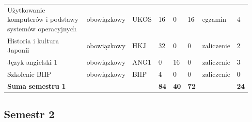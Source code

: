 \documentclass[12pt,a4paper]{article}
\begin{document}
{\begin{longtable}{m{5.0cm}m{1.9cm}m{0.75cm}m{0.85cm}m{0.85cm}m{0.85cm}m{1.45cm}m{0.9cm}}
\rowcolor{tableRowLight} Użytkowanie komputerów i podstawy systemów operacyjnych & {\scriptsize obowiązkowy} & UKOS & 16 & 0 & 16 & {\scriptsize egzamin} & 4 \\
\rowcolor{tableRowAlt} Historia i kultura Japonii & {\scriptsize obowiązkowy} & HKJ & 32 & 0 & 0 & {\scriptsize zaliczenie} & 2 \\
\rowcolor{tableRowLight} Język angielski 1 & {\scriptsize obowiązkowy} & ANG1 & 0 & 16 & 0 & {\scriptsize zaliczenie} & 3 \\
\rowcolor{tableRowAlt} Szkolenie BHP & {\scriptsize obowiązkowy} & BHP & 4 & 0 & 0 & {\scriptsize zaliczenie} & 0 \\
\midrule[\heavyrulewidth]
\rowcolor{tableSummary} \textbf{Suma semestru 1} & & & \textbf{84} & \textbf{40} & \textbf{72} & & \textbf{24} \\
\bottomrule
\end{longtable}}

\subsection*{Semestr 2}
\end{document}
